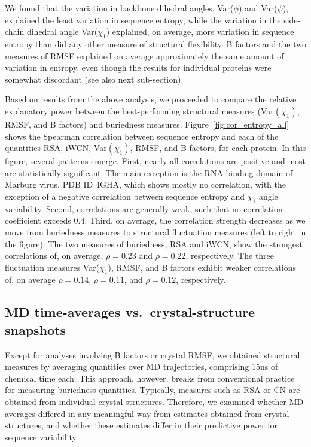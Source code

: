 \documentclass[smallextended]{svjour3}
\begin{document}
We found that the variation in backbone dihedral angles, Var($\phi$) and Var($\psi$), explained the least variation in sequence entropy, while the variation in the side-chain dihedral angle Var($\chi_1$) explained, on average, more variation in sequence entropy than did any other measure of structural flexibility. B factors and the two measures of RMSF explained on average approximately the same amount of variation in entropy, even though the results for individual proteins were somewhat discordant (see also next sub-section). 

Based on results from the above analysis, we proceeded to compare the relative explanatory power between the best-performing structural measures (Var$(\chi_1)$, RMSF, and B factors) and buriedness measures. Figure~\ref{fig:cor_entropy_all} shows the Spearman correlation between sequence entropy and each of the quantities RSA, iWCN, Var$(\chi_1)$, RMSF, and B factors, for each protein. In this figure, several patterns emerge. First, nearly all correlations are positive and most are statistically significant. The main exception is the RNA binding domain of Marburg virus, PDB ID 4GHA, which shows mostly no correlation, with the exception of a negative correlation between sequence entropy and $\chi_1$ angle variability. Second, correlations are generally weak, such that no correlation coefficient exceeds 0.4. Third, on average, the correlation strength decreases as we move from buriedness measures to structural fluctuation measures (left to right in the figure). The two measures of buriedness, RSA and iWCN, show the strongest correlations of, on average, $\rho=0.23$ and $\rho=0.22$, respectively. The three fluctuation measures Var($\chi_1$), RMSF, and B factors exhibit weaker correlations of, on average $\rho=0.14$, $\rho=0.11$, and $\rho=0.12$, respectively.


\subsection*{MD time-averages vs.\ crystal-structure snapshots}

Except for analyses involving B factors or crystal RMSF, we obtained structural measures by averaging quantities over MD trajectories, comprising 15ns of chemical time each. This approach, however, breaks from conventional practice for measuring buriedness quantities. Typically, measures such as RSA or CN are obtained from individual crystal structures. Therefore, we examined whether MD averages differed in any meaningful way from estimates obtained from crystal structures, and whether these estimates differ in their predictive power for sequence variability.
\end{document}
